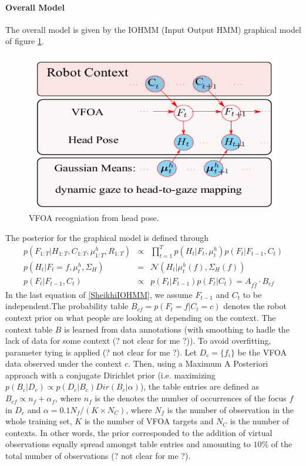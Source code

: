 \documentclass[11pt,a4paper]{article}
\begin{document}
\paragraph{Overall Model}
The overall model is given by the IOHMM (Input Output HMM) graphical model of figure \ref{SheikhiVFOAModel}.

\begin{figure}[!h]
\centering
\includegraphics[scale = 0.5]{./Pictures/SheikhiVFOAModel.png}
\caption{VFOA recogniation from head pose. \label{SheikhiVFOAModel}}
\end{figure}

The posterior for the graphical model is defined through
\begin{equation}
\begin{array}{rcl}
p(F_{1:T} | H_{1:T},C_{1:T},\mu_{1:T}^h,R_{1:T}) &\propto& \prod_{t=1}^{T} p(H_t|F_t,\mu_t^h)p(F_t|F_{t-1},C_t) \\
p(H_t | F_t = f,\mu_t^h,\Sigma_H) &=& \mathcal{N}(H_t|\mu_t^h(f),\Sigma_H(f)) \\
p(F_t | F_{t-1}, C_t) &\propto& p(F_t | F_{t-1}) p(F_t | C_t) = A_{f\hat{f}} \cdot B_{cf} 
\end{array}
\label{SheikhiIOHMM}
\end{equation}
In the last equation of \eqref{SheikhiIOHMM}, we assume $F_{t-1}$ and $C_t$ to be independent.The probability table $B_{cf} = p(F_t=f | C_t=c)$ denotes the robot context prior on what people are looking at depending on the context. The context table $B$ is learned from data annotations (with smoothing to hadle the lack of data for some context (? not clear for me ?)). To avoid overfitting, parameter tying is applied (? not clear for me ?). Let $D_c = \{f_i\}$ be the VFOA data observed under the context $c$. Then, using a Maximum A Posteriori approach with a conjugate Dirichlet prior (i.e. maximizing $p(B_c|D_c) \propto p(D_c | B_c) Dir(B_c | \alpha)$), the table entries are defined as $B_{cf} \propto n_f + \alpha_f$, where $n_f$ is the denotes the number of occurrences of the focus $f$ in $D_c$ and $\alpha = 0.1N_f/(K\times N_C)$, where $N_f$ is the number of observation in the whole training set, $K$ is the number of VFOA targets and $N_C$ is the number of contexts. In other words, the prior corresponded to the addition of virtual observations equally spread amongst table entries and amounting to $10\%$ of the total number of observations (? not clear for me ?).
\end{document}

